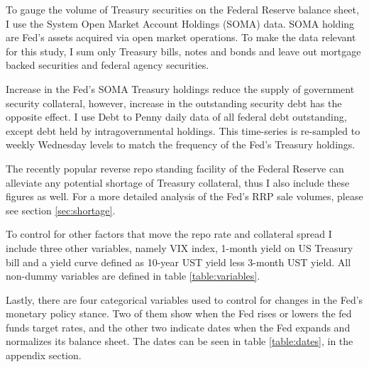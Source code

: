 \documentclass[11pt,a4paper,english,oneside]{article}
\begin{document}
To gauge the volume of Treasury securities on the Federal Reserve balance sheet, I use the System Open Market Account Holdings (SOMA) data. SOMA holding are Fed's assets acquired via open market operations. To make the data relevant for this study, I sum only Treasury bills, notes and bonds and leave out mortgage backed securities and federal agency securities.

Increase in the Fed's SOMA Treasury holdings reduce the supply of government security collateral, however, increase in the outstanding security debt has the opposite effect. I use Debt to Penny daily data of all federal debt outstanding, except debt held by intragovernmental holdings. This time-series is re-sampled to weekly Wednesday levels to match the frequency of the Fed's Treasury holdings.

The recently popular reverse repo standing facility of the Federal Reserve can alleviate any potential shortage of Treasury collateral, thus I also include these figures as well. For a more detailed analysis of the Fed's RRP sale volumes, please see section \ref{sec:shortage}.

To control for other factors that move the repo rate and collateral spread I include three other variables, namely VIX index, 1-month yield on US Treasury bill and a yield curve defined as 10-year UST yield less 3-month UST yield. All non-dummy variables are defined in table \ref{table:variables}.

Lastly, there are four categorical variables used to control for changes in the Fed's monetary policy stance. Two of them show when the Fed rises or lowers the fed funds target rates, and the other two indicate dates when the Fed expands and normalizes its balance sheet. The dates can be seen in table \ref{table:dates}, in the appendix section.
\end{document}

